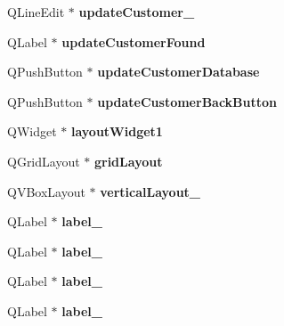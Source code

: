 \begin{DoxyCompactItemize}
Q\+Line\+Edit $\ast$ {\bfseries update\+Customer\+\_}
\item 
\mbox{\label{class_ui___main_window_a42a5f0790625f5505c796972bbe2ac4f}} 
Q\+Label $\ast$ {\bfseries update\+Customer\+Found}
\item 
\mbox{\label{class_ui___main_window_af56f7d6315c310cc2372580891081c65}} 
Q\+Push\+Button $\ast$ {\bfseries update\+Customer\+Database}
\item 
\mbox{\label{class_ui___main_window_af43f57c2888c29e05110b4c546883602}} 
Q\+Push\+Button $\ast$ {\bfseries update\+Customer\+Back\+Button}
\item 
\mbox{\label{class_ui___main_window_aab31b3dec8d767525dea6f163e029e48}} 
Q\+Widget $\ast$ {\bfseries layout\+Widget1}
\item 
\mbox{\label{class_ui___main_window_a525ed3c5fe0784ac502ee222fba4e205}} 
Q\+Grid\+Layout $\ast$ {\bfseries grid\+Layout}
\item 
\mbox{\label{class_ui___main_window_a93c190b085c63a667c535ba0bbcfec7c}} 
Q\+V\+Box\+Layout $\ast$ {\bfseries vertical\+Layout\+\_}
\item 
\mbox{\label{class_ui___main_window_a1f4ff90c122fededcc08604401442034}} 
Q\+Label $\ast$ {\bfseries label\+\_}
\item 
\mbox{\label{class_ui___main_window_aa2621565827195e88436fb54220bb48d}} 
Q\+Label $\ast$ {\bfseries label\+\_}
\item 
\mbox{\label{class_ui___main_window_a1c16c0a684617927472e534822a63c7d}} 
Q\+Label $\ast$ {\bfseries label\+\_}
\item 
\mbox{\label{class_ui___main_window_ab6ac4329a89041f557332f6569d94493}} 
Q\+Label $\ast$ {\bfseries label\+\_}
\item 
\mbox{\label{class_ui___main_window_a55100f53189f25cf8a1ee0beb29be642}} 

\end{DoxyCompactItemize}
